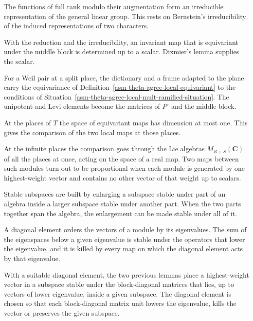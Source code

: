The functions of full rank modulo their augmentation form an irreducible
representation of the general linear group. This rests on Bernstein's
irreducibility of the induced representations of two characters.

With the reduction and the irreducibility, an invariant map that is
equivariant under the middle block is determined up to a scalar. Dixmier's lemma
supplies the scalar.

For a Weil pair at a split place, the dictionary and a frame adapted to the
plane carry the equivariance of Definition~\ref{asm-theta-agree-local-equivariant}
to the conditions of Situation~\ref{asm-theta-agree-local-mult-ramified-situation}.
The unipotent and Levi elements become the matrices of $P^\circ$ and the middle
block.

At the places of $T$ the space of equivariant maps has dimension at most one.
This gives the comparison of the two local maps at those places.

At the infinite places the comparison goes through the Lie algebras
$M_{R+S}(\mathbf C)$ of all the places at once, acting on the space of a real
map. Two maps between such modules turn out to be proportional when each module
is generated by one highest-weight vector and contains no other vector of that
weight up to scalars.

Stable subspaces are built by enlarging a subspace stable under part of an
algebra inside a larger subspace stable under another part. When the two parts
together span the algebra, the enlargement can be made stable under all of it.

A diagonal element orders the vectors of a module by its eigenvalues. The sum of
the eigenspaces below a given eigenvalue is stable under the operators that
lower the eigenvalue, and it is killed by every map on which the diagonal
element acts by that eigenvalue.

With a suitable diagonal element, the two previous lemmas place a highest-weight
vector in a subspace stable under the block-diagonal matrices that lies, up to
vectors of lower eigenvalue, inside a given subspace. The diagonal element is
chosen so that each block-diagonal matrix unit lowers the eigenvalue, kills the
vector or preserves the given subspace.


